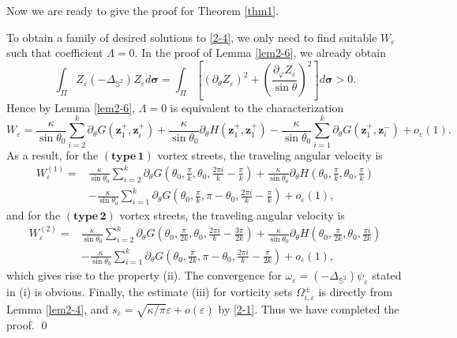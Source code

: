 \documentclass[12pt,reqno]{amsart}
\numberwithin{equation}{section}
\theoremstyle{definition}
\theoremstyle{remark}
\begin{document}
	\noindent Now we are ready to give the proof for Theorem \ref{thm1}.
	
	 To obtain a family of desired solutions to \eqref{2-4}, we only need to find suitable $W_\varepsilon$ such that coefficient $\Lambda=0$. In the proof of Lemma \ref{lem2-6}, we already obtain
	\begin{equation*}
		\int_\Pi Z_\varepsilon(-\Delta_{\mathbb S^2})Z_\varepsilon d\boldsymbol \sigma=\int_{\Pi} \left[(\partial_\theta Z_\varepsilon)^2+\left(\frac{\partial_\varphi Z_\varepsilon}{\sin\theta}\right)^2\right]d\boldsymbol \sigma>0.
	\end{equation*} 
	Hence by Lemma \ref{lem2-6}, $\Lambda=0$ is equivalent to the characterization
	\begin{equation*}
		W_\varepsilon=\frac{\kappa}{\sin\theta_0}\sum\limits_{i=2}^k\partial_\theta G(\boldsymbol z_1^+,\boldsymbol z_i^+)+\frac{\kappa}{\sin\theta_0}\partial_\theta H(\boldsymbol z_1^+,\boldsymbol z_1^+)-\frac{\kappa}{\sin\theta_0}\sum\limits_{i=1}^k\partial_\theta G(\boldsymbol z_1^+,\boldsymbol z_i^-)+o_\varepsilon(1).
	\end{equation*}
	As a result, for the $(\mathbf{type\, 1})$ vortex streets, the traveling angular velocity is
	\begin{align*}
		W_\varepsilon^{(1)}=&\frac{\kappa}{\sin\theta_0}\sum\limits_{i=2}^k\partial_\theta G\left(\theta_0,\frac{\pi}{k},\theta_0,\frac{2\pi i}{k}-\frac{\pi}{k}\right)+\frac{\kappa}{\sin\theta_0}\partial_\theta H\left(\theta_0,\frac{\pi}{k},\theta_0,\frac{\pi }{k}\right)\\
		&-\frac{\kappa}{\sin\theta_0}\sum\limits_{i=1}^k\partial_\theta G\left(\theta_0,\frac{\pi}{k},\pi-\theta_0,\frac{2\pi i}{k}-\frac{\pi}{k}\right)+o_\varepsilon(1),
	\end{align*}
	and for the $(\mathbf{type\, 2})$ vortex streets, the traveling angular velocity is
   	\begin{align*}
   		W_\varepsilon^{(2)}=&\frac{\kappa}{\sin\theta_0}\sum\limits_{i=2}^k\partial_\theta G\left(\theta_0,\frac{\pi}{2k},\theta_0,\frac{2\pi i}{k}-\frac{3\pi}{2k}\right)+\frac{\kappa}{\sin\theta_0}\partial_\theta H\left(\theta_0,\frac{\pi}{2k},\theta_0,\frac{\pi i}{2k}\right)\\
   		&-\frac{\kappa}{\sin\theta_0}\sum\limits_{i=1}^k\partial_\theta G\left(\theta_0,\frac{\pi}{2k},\pi-\theta_0,\frac{2\pi i}{k}-\frac{\pi}{2k}\right)+o_\varepsilon(1),
   	\end{align*}
	which gives rise to the property (ii). The convergence for $\omega_\varepsilon=(-\Delta_{\mathbb S^2})\psi_\varepsilon$ stated in (i) is obvious. Finally, the estimate (iii) for vorticity sets $\Omega_{i,\varepsilon}^\pm$ is directly from Lemma \ref{lem2-4}, and $s_\varepsilon=\sqrt{\kappa/\pi} \varepsilon+o(\varepsilon)$ by \eqref{2-1}. Thus we have completed the proof.	\qed
	
\end{document}
